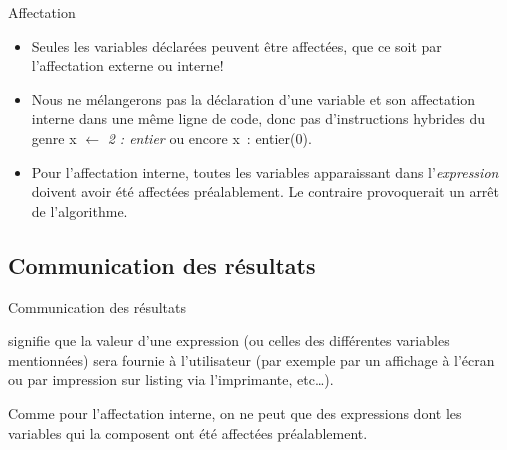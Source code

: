 \begin{frame}{Affectation}
	\begin{itemize}
	\item 
		Seules les variables déclarées peuvent être affectées, que ce soit par
		l’affectation externe ou interne!
	\item 
		Nous ne mélangerons pas la déclaration d’une variable et son
		affectation interne dans une même ligne de code, donc pas
		d’instructions hybrides du genre 
		\textsf{x}{ $\gets$ }\textit{2 : entier} ou encore 
		\textsf{x~: entier(0)}.
	\item 
		Pour l’affectation interne, toutes les variables apparaissant dans
		l'\textit{expression} doivent avoir été affectées
		préalablement. Le contraire provoquerait un arrêt de l’algorithme.
	\end{itemize}
	
\end{frame}

\subsection{Communication des résultats}
\begin{frame}{Communication des résultats}


	\bigskip
	
	signifie que la valeur d’une expression (ou celles des différentes
	variables mentionnées) sera fournie à l’utilisateur (par exemple par un
	affichage à l’écran ou par impression sur listing via l’imprimante,
	etc\dots).
	
	\bigskip
	
	Comme pour l’affectation interne, on ne peut 
	que des expressions dont les variables qui la composent ont été 
	affectées préalablement.
\end{frame}

